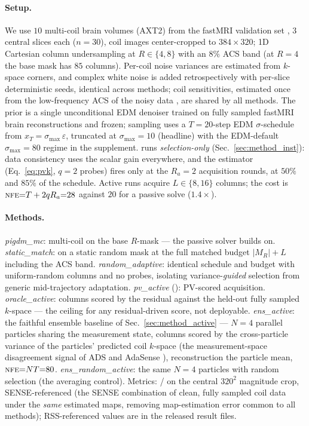 \paragraph{Setup.} We use $10$ multi-coil brain volumes (AXT2) from
the fastMRI validation set \cite{zbontar2018fastmri}, $3$ central
slices each ($n{=}30$), coil images center-cropped to $384{\times}320$;
1D Cartesian column undersampling at $R\in\{4,8\}$ with an $8\%$ ACS
band (at $R{=}4$ the base mask has $85$ columns\RLOCAL). Per-coil noise
variances are estimated from $k$-space corners, and complex white noise
is added retrospectively with per-slice deterministic seeds, identical
across methods; coil sensitivities, estimated once from the
low-frequency ACS of the noisy data \cite{uecker2014espirit}, are
shared by all methods. The prior is a single unconditional EDM denoiser
\cite{karras2022edm} trained on fully sampled fastMRI brain
reconstructions and frozen; sampling uses a $T{=}20$-step EDM
$\sigma$-schedule from $x_T=\sigma_{\max}\,\varepsilon$, truncated at
$\sigma_{\max}{=}10$ (headline) with the EDM-default
$\sigma_{\max}{=}80$ regime in the supplement. \pvas{} runs
\emph{selection-only} (Sec.~\ref{sec:method_inst}): data consistency
uses the scalar \pigdm{} gain everywhere, and the estimator
(Eq.~\ref{eq:pvk}, $q{=}2$ probes) fires only at the $R_a{=}2$
acquisition rounds, at $50\%$ and $85\%$ of the schedule. Active runs
acquire $L\in\{8,16\}$ columns; the cost is $\textsc{nfe}{=}T+2qR_a{=}28$
against $20$ for a passive solve ($1.4\times$).

\paragraph{Methods.} \emph{pigdm\_mc}: multi-coil \pigdm{}
\cite{song2023pigdm} on the base $R$-mask --- the passive solver
\pvas{} builds on. \emph{static\_match}: \pigdm{} on a static random
mask at the full matched budget $\lvert M_R\rvert{+}L$ including the
ACS band. \emph{random\_adaptive}: identical schedule and budget with
uniform-random columns and no probes, isolating variance-\emph{guided}
selection from generic mid-trajectory adaptation. \emph{pv\_active}
(\pvas): PV-scored acquisition. \emph{oracle\_active}: columns scored
by the residual against the held-out fully sampled $k$-space --- the
ceiling for any residual-driven score, not deployable.
\emph{ens\_active}: the faithful ensemble baseline of
Sec.~\ref{sec:method_active} --- $N{=}4$ parallel \pigdm{} particles
sharing the measurement state, columns scored by the cross-particle
variance of the particles' predicted coil $k$-space (the
measurement-space disagreement signal of ADS and AdaSense
\cite{nolan2025ads,elata2024adasense}), reconstruction the particle
mean, $\textsc{nfe}{=}NT{=}80$. \emph{ens\_random\_active}: the same $N{=}4$
particles with random selection (the averaging control). Metrics:
\psnrm/\ssimm{} on the central $320^2$ magnitude crop, SENSE-referenced
(the SENSE combination of clean, fully sampled coil data under the
\emph{same} estimated maps, removing map-estimation error common to all
methods); RSS-referenced values are in the released result files.

